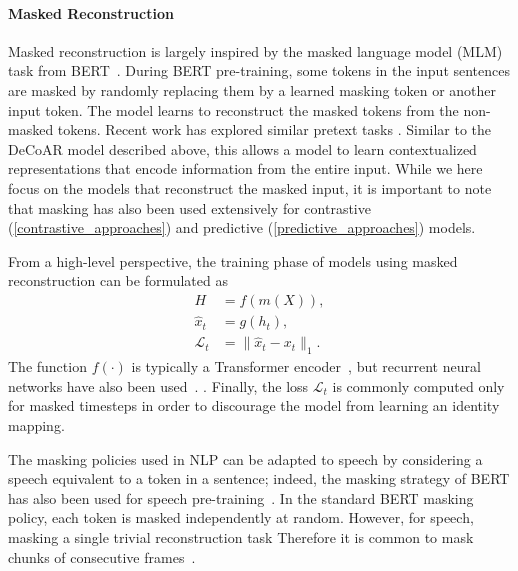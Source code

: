 \paragraph{Masked Reconstruction}

Masked reconstruction is largely inspired by the masked language model (MLM) task from BERT~\cite{devlin_bert:_2018}. During BERT pre-training, some tokens in the input sentences are masked by randomly replacing them by a learned masking token or another input token. The model learns to reconstruct the masked tokens from the non-masked tokens. Recent work has explored similar pretext tasks . Similar to the DeCoAR model described above, this allows a model to learn contextualized representations that encode information from the entire input. While we here focus on the models that reconstruct the masked input, it is important to note that masking has also been used extensively for contrastive (\cref{contrastive_approaches}) and predictive (\cref{predictive_approaches}) models. 

From a high-level perspective, the training phase of models using masked
reconstruction can be formulated as
\begin{align}
    H &= f(m(X)), \\
    \hat{x}_t &= g(h_{t}), \\
    \mathcal{L}_t &= \lVert \hat{x}_{t} - x_{t} \rVert_1 .
\end{align}
The function $f(\cdot)$ is typically a Transformer encoder~\cite{liu_mockingjay_2020,jiang_improving_2019,liu_masked_2020}, but recurrent neural networks have also been used~\cite{wang_unsupervised_2020}.  . Finally, the loss $\mathcal{L}_t$ is commonly computed only for masked timesteps in order to discourage the model from learning an identity mapping.

The masking policies used in NLP can be adapted to speech by considering a speech  equivalent to a token in a sentence; indeed, the masking strategy of BERT has also been used for speech pre-training~\cite{liu_mockingjay_2020}.
In the standard BERT masking policy, each token is masked independently at random. However, for speech, masking a single  trivial reconstruction task  Therefore it is common to mask chunks of consecutive frames~\cite{liu_mockingjay_2020,jiang_further_2021}. 

